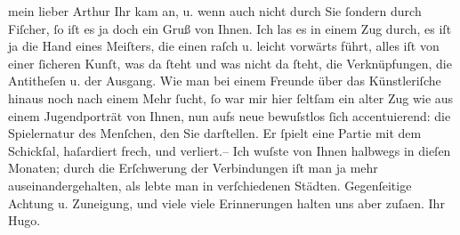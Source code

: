 \pstart{}mein lieber Arthur\pend\vspace{0.5em}
\pstart
           Ihr \label{K_L02297-1v}\label{K_L02297-1}
               kam an, u. wenn auch nicht durch Sie ſondern durch Fiſcher, ſo iſt es ja doch ein Gruß von Ihnen. Ich las es in einem Zug
               durch, es iſt ja die Hand eines Meiſters, die einen raſch u. leicht vorwärts führt,
               alles iſt von einer ſicheren Kunſt, was da ſteht und was nicht da ſteht, die
               Verknüpfungen, die Antitheſen u. der Ausgang. Wie man bei einem Freunde über das
               Künstleriſche hinaus noch nach {\pb}einem Mehr ſucht, ſo war mir hier ſeltſam ein alter Zug wie aus einem Jugendporträt
               von Ihnen, nun aufs neue bewuſstlos ſich accentuierend: die Spielernatur des
               Menſchen, den Sie darſtellen. Er ſpielt eine Partie mit dem Schickſal, haſardiert
               frech, und verliert.\hspace*{1.5em}– Ich wuſste von Ihnen halbwegs
               in dieſen Monaten; durch die Erſchwerung der Verbindungen iſt man ja mehr
               auseinandergehalten, als lebte man in verſchiedenen Städten. Gegenſeitige Achtung u.
               Zuneigung, und viele viele Erinnerungen halten uns aber zuſa{\geminationm}en.\pend
           \pstart Ihr \spacefill\mbox{Hugo.}\pend{}\endnumbering{}  
      